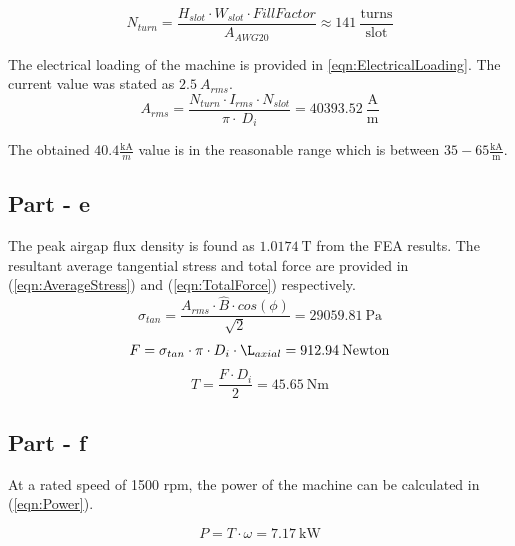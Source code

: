 \documentclass{article}
\begin{document}
\begin{equation} \label{eqn:NumberOfTurnsPerSlot}
    N_{turn} = \frac{H_{slot} \cdot W_{slot} \cdot FillFactor}{A_{AWG20}} \approx 141 \: \frac{\mathrm{turns}}{\mathrm{slot}}
\end{equation}


The electrical loading of the machine is provided in \ref{eqn:ElectricalLoading}. The current value was stated as $2.5 \: A_{rms}$. 
\begin{equation} \label{eqn:ElectricalLoading}
    A_{rms} = \frac{N_{turn} \cdot I_{rms} \cdot N_{slot}}{\pi \cdot \: D_i} = 40393.52 \: \mathrm{\frac{\mathrm{A}}{\mathrm{m}}}
\end{equation}



The obtained $40.4 \frac{\mathrm{kA}}{m}$ value is in the reasonable range which is between $35-65 \frac{\mathrm{kA}}{\mathrm{m}}$.

\subsection{Part - e}
The peak airgap flux density is found as $1.0174\: \mathrm{T} $ from the FEA results. The resultant average tangential stress and total force are provided in (\ref{eqn:AverageStress}) and (\ref{eqn:TotalForce}) respectively.
\begin{equation} \label{eqn:AverageStress}
    \sigma_{tan} = \frac{A_{rms} \cdot \hat{B} \cdot cos(\phi)}{\sqrt{2}} = 29059.81 \: \mathrm{Pa}
\end{equation}
\begin{equation} \label{eqn:TotalForce}
    F = \sigma_{tan} \cdot \pi \cdot D_i \cdot \L_{axial} = 912.94 \: \mathrm{Newton}
\end{equation}
\begin{equation} \label{eqn:Torque}
    T = \frac{F \cdot D_i}{2} = 45.65 \: \mathrm{Nm}
\end{equation}

\subsection{Part - f}
At a rated speed of 1500 rpm, the power of the machine can be calculated in (\ref{eqn:Power}).

\begin{equation} \label{eqn:Power}
    P = T \cdot \omega  = 7.17 \: \mathrm{kW}
\end{equation}




%
%


\end{document}
